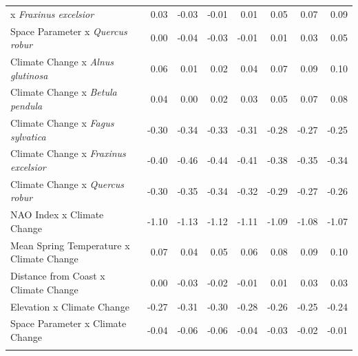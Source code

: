 \documentclass{article}\usepackage[]{graphicx}\usepackage[]{color}
\begin{document}
\begin{longtable}{lrrrrrrr}
x\textit{ Fraxinus excelsior} & 0.03 & -0.03 & -0.01 & 0.01 & 0.05 & 0.07 & 0.09 \\ 
  Space Parameter
x\textit{ Quercus robur} & 0.00 & -0.04 & -0.03 & -0.01 & 0.01 & 0.03 & 0.05 \\ 
  Climate Change
x\textit{ Alnus glutinosa} & 0.06 & 0.01 & 0.02 & 0.04 & 0.07 & 0.09 & 0.10 \\ 
  Climate Change
x\textit{ Betula pendula} & 0.04 & 0.00 & 0.02 & 0.03 & 0.05 & 0.07 & 0.08 \\ 
  Climate Change
x\textit{ Fagus sylvatica} & -0.30 & -0.34 & -0.33 & -0.31 & -0.28 & -0.27 & -0.25 \\ 
  Climate Change
x\textit{ Fraxinus excelsior} & -0.40 & -0.46 & -0.44 & -0.41 & -0.38 & -0.35 & -0.34 \\ 
  Climate Change
x\textit{ Quercus robur} & -0.30 & -0.35 & -0.34 & -0.32 & -0.29 & -0.27 & -0.26 \\ 
  NAO Index x Climate Change & -1.10 & -1.13 & -1.12 & -1.11 & -1.09 & -1.08 & -1.07 \\ 
  Mean Spring 
Temperature x Climate Change & 0.07 & 0.04 & 0.05 & 0.06 & 0.08 & 0.09 & 0.10 \\ 
  Distance from 
Coast x Climate Change & 0.00 & -0.03 & -0.02 & -0.01 & 0.01 & 0.03 & 0.03 \\ 
  Elevation x Climate Change & -0.27 & -0.31 & -0.30 & -0.28 & -0.26 & -0.25 & -0.24 \\ 
  Space Parameter x Climate Change & -0.04 & -0.06 & -0.06 & -0.04 & -0.03 & -0.02 & -0.01 \\ 
   \hline
\hline
\label{tab:suppmodlong}
\end{longtable}
\end{document}
